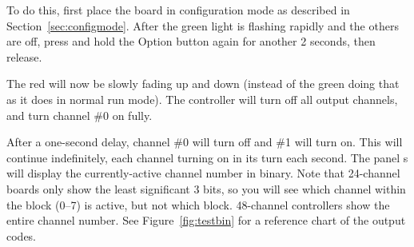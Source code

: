 \documentclass[letterpaper,twoside,onecolumn,openright,final]{memoir}
\begin{document}
To do this, first place the board in configuration mode as described in Section~\ref{sec:configmode}.
After the green light is flashing rapidly and the others are off, press and hold the Option button
again %
for another 2 seconds, then release.

The red  will now be slowly fading up and down (instead of the green  doing that
as it does in normal run mode).  The controller will turn off all output channels, and turn channel \#0
on fully.  

After a one-second delay, channel \#0 will turn off and \#1 will turn on.  This will continue indefinitely,
each channel turning on in its turn each second.  The panel s will display the currently-active
channel number in binary.  Note that 24-channel boards only show the least significant 3 bits, so you
will see which channel within the block (0--7) is active, but not which block.  48-channel controllers
show the entire channel number.  See Figure~\ref{fig:testbin} for a reference chart of the output
codes.
\end{document}
